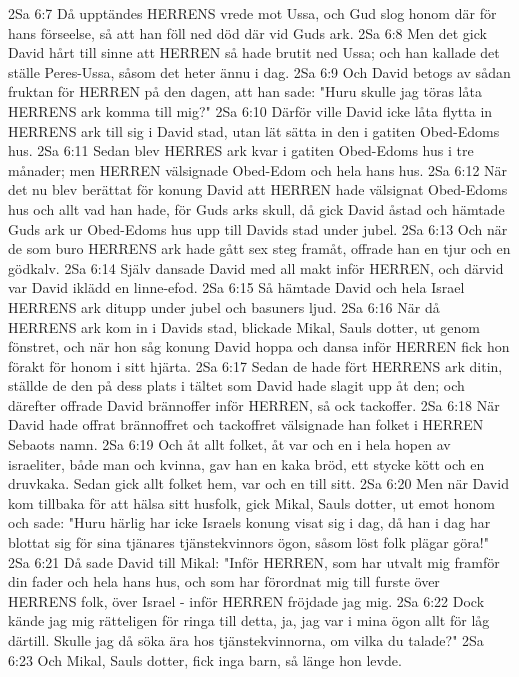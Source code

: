 2Sa 6:7  Då upptändes HERRENS vrede mot Ussa, och Gud slog honom där för hans förseelse, så att han föll ned död där vid Guds ark.
2Sa 6:8  Men det gick David hårt till sinne att HERREN så hade brutit ned Ussa; och han kallade det ställe Peres-Ussa, såsom det heter ännu i dag.
2Sa 6:9  Och David betogs av sådan fruktan för HERREN på den dagen, att han sade: "Huru skulle jag töras låta HERRENS ark komma till mig?"
2Sa 6:10  Därför ville David icke låta flytta in HERRENS ark till sig i David stad, utan lät sätta in den i gatiten Obed-Edoms hus.
2Sa 6:11  Sedan blev HERRES ark kvar i gatiten Obed-Edoms hus i tre månader; men HERREN välsignade Obed-Edom och hela hans hus.
2Sa 6:12  När det nu blev berättat för konung David att HERREN hade välsignat Obed-Edoms hus och allt vad han hade, för Guds arks skull, då gick David åstad och hämtade Guds ark ur Obed-Edoms hus upp till Davids stad under jubel.
2Sa 6:13  Och när de som buro HERRENS ark hade gått sex steg framåt, offrade han en tjur och en gödkalv.
2Sa 6:14  Själv dansade David med all makt inför HERREN, och därvid var David iklädd en linne-efod.
2Sa 6:15  Så hämtade David och hela Israel HERRENS ark ditupp under jubel och basuners ljud.
2Sa 6:16  När då HERRENS ark kom in i Davids stad, blickade Mikal, Sauls dotter, ut genom fönstret, och när hon såg konung David hoppa och dansa inför HERREN fick hon förakt för honom i sitt hjärta.
2Sa 6:17  Sedan de hade fört HERRENS ark ditin, ställde de den på dess plats i tältet som David hade slagit upp åt den; och därefter offrade David brännoffer inför HERREN, så ock tackoffer.
2Sa 6:18  När David hade offrat brännoffret och tackoffret välsignade han folket i HERREN Sebaots namn.
2Sa 6:19  Och åt allt folket, åt var och en i hela hopen av israeliter, både man och kvinna, gav han en kaka bröd, ett stycke kött och en druvkaka. Sedan gick allt folket hem, var och en till sitt.
2Sa 6:20  Men när David kom tillbaka för att hälsa sitt husfolk, gick Mikal, Sauls dotter, ut emot honom och sade: "Huru härlig har icke Israels konung visat sig i dag, då han i dag har blottat sig för sina tjänares tjänstekvinnors ögon, såsom löst folk plägar göra!"
2Sa 6:21  Då sade David till Mikal: "Inför HERREN, som har utvalt mig framför din fader och hela hans hus, och som har förordnat mig till furste över HERRENS folk, över Israel - inför HERREN fröjdade jag mig.
2Sa 6:22  Dock kände jag mig rätteligen för ringa till detta, ja, jag var i mina ögon allt för låg därtill. Skulle jag då söka ära hos tjänstekvinnorna, om vilka du talade?"
2Sa 6:23  Och Mikal, Sauls dotter, fick inga barn, så länge hon levde.
